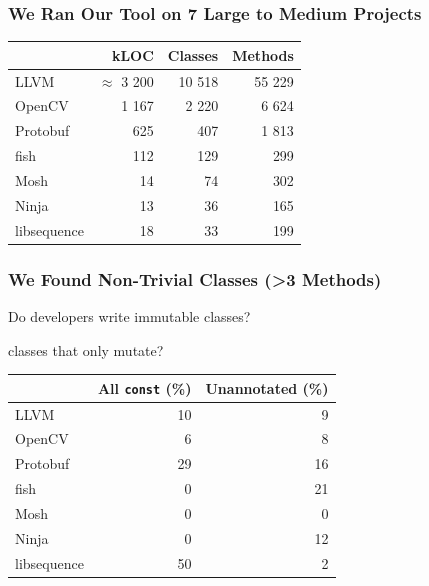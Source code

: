 \documentclass[aspectratio=169]{beamer}
\begin{document}
  \begin{frame}
    \frametitle{We Ran Our Tool on 7 Large to Medium Projects}

    \begin{center}\begin{tabular}{l r r r}
                  & kLOC            & Classes & Methods \\
      \hline
      LLVM        & $\approx$ 3 200 &  10 518 &  55 229 \\
      OpenCV      &           1 167 &   2 220 &   6 624 \\
      Protobuf    &             625 &     407 &   1 813 \\
      fish        &             112 &     129 &     299 \\
      Mosh        &              14 &      74 &     302 \\
      Ninja       &              13 &      36 &     165 \\
      libsequence &              18 &      33 &     199 \\
    \end{tabular}\end{center}
  \end{frame}

  \begin{frame}
    \frametitle{We Found Non-Trivial Classes (>3 Methods)}

    Do developers write immutable classes?

    \hspace{1em} classes that only mutate?

    \vspace{2em}

    \begin{center}\begin{tabular}{l r r}
                  & All \texttt{const} (\%) & Unannotated (\%) \\
      \hline
      LLVM        & 10 &  9 \\
      OpenCV      &  6 &  8 \\
      Protobuf    & 29 & 16 \\
      fish        &  0 & 21 \\
      Mosh        &  0 &  0 \\
      Ninja       &  0 & 12 \\
      libsequence & 50 &  2 \\
    \end{tabular}\end{center}
  \end{frame}
\end{document}
